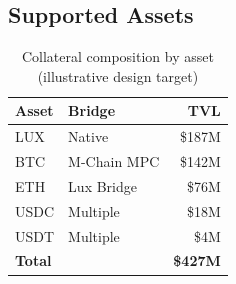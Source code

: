 \subsection{Supported Assets}

\begin{table}[h]
\centering
\begin{tabular}{@{}llr@{}}
\toprule
\textbf{Asset} & \textbf{Bridge} & \textbf{TVL} \\ \midrule
LUX & Native & \$187M \\
BTC & M-Chain MPC & \$142M \\
ETH & Lux Bridge & \$76M \\
USDC & Multiple & \$18M \\
USDT & Multiple & \$4M \\ \midrule
\textbf{Total} & & \textbf{\$427M} \\ \bottomrule
\end{tabular}
\caption{Collateral composition by asset (illustrative design target)}
\end{table}

